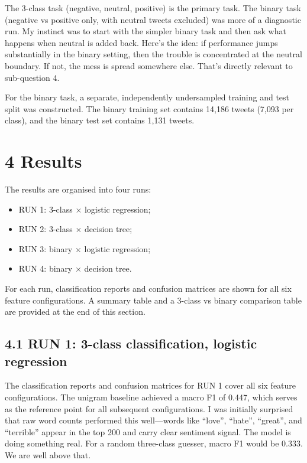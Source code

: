 \documentclass[12pt]{article}
\begin{document}
The 3-class task (negative, neutral, positive) is the primary task. The binary task (negative vs positive only, with neutral tweets excluded) was more of a diagnostic run. My instinct was to start with the simpler binary task and then ask what happens when neutral is added back. Here's the idea: if performance jumps substantially in the binary setting, then the trouble is concentrated at the neutral boundary. If not, the mess is spread somewhere else. That's directly relevant to sub-question 4.

For the binary task, a separate, independently undersampled training and test split was constructed. The binary training set contains 14,186 tweets (7,093 per class), and the binary test set contains 1,131 tweets.



\section*{4 Results}



The results are organised into four runs:

\begin{itemize}

  \item RUN 1: 3-class $\times$ logistic regression;

  \item RUN 2: 3-class $\times$ decision tree;

  \item RUN 3: binary $\times$ logistic regression;

  \item RUN 4: binary $\times$ decision tree.

\end{itemize} For each run, classification reports and confusion matrices are shown for all six feature configurations. A summary table and a 3-class vs binary comparison table are provided at the end of this section.



\subsection*{4.1 RUN 1: 3-class classification, logistic regression}



The classification reports and confusion matrices for RUN 1 cover all six feature configurations. The unigram baseline achieved a macro F1 of 0.447, which serves as the reference point for all subsequent configurations. I was initially surprised that raw word counts performed this well---words like ``love'', ``hate'', ``great'', and ``terrible'' appear in the top 200 and carry clear sentiment signal. The model is doing something real. For a random three-class guesser, macro F1 would be 0.333. We are well above that.
\end{document}
